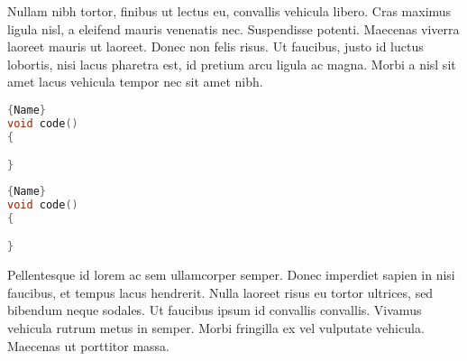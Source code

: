 Nullam nibh tortor, finibus ut lectus eu, convallis vehicula libero. Cras maximus ligula nisl, a eleifend mauris venenatis nec. Suspendisse potenti. Maecenas viverra laoreet mauris ut laoreet. Donec non felis risus. Ut faucibus, justo id luctus lobortis, nisi lacus pharetra est, id pretium arcu ligula ac magna. Morbi a nisl sit amet lacus vehicula tempor nec sit amet nibh. 

\noindent\begin{minipage}{.45\textwidth}
\begin{lstlisting}[language=C++, caption=code 1 with a long and wrapping title,frame=tb]{Name}
void code()
{

}
\end{lstlisting}
\end{minipage}\hfill
\begin{minipage}{.45\textwidth}
\begin{lstlisting}[language=C++, caption=code 2 with a long and wrapping title,frame=tb]{Name}
void code()
{

}
\end{lstlisting}
\end{minipage}

Pellentesque id lorem ac sem ullamcorper semper. Donec imperdiet sapien in nisi faucibus, et tempus lacus hendrerit. Nulla laoreet risus eu tortor ultrices, sed bibendum neque sodales. Ut faucibus ipsum id convallis convallis. Vivamus vehicula rutrum metus in semper. Morbi fringilla ex vel vulputate vehicula. Maecenas ut porttitor massa.





